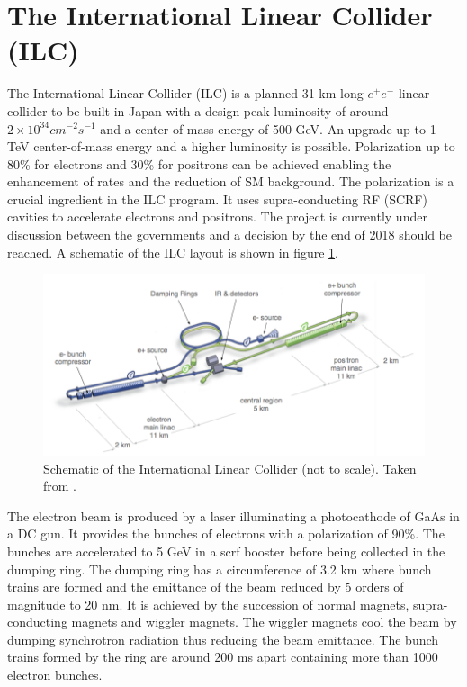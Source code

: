 \section{The International Linear Collider (ILC)}
\label{sec:ILC}

The International Linear Collider (ILC) is a planned 31 km long $e^+e^-$ linear collider to be built in Japan with a design peak luminosity of around $2 \times 10^{34} cm^{-2}s^{-1}$ and a center-of-mass energy of 500 GeV. An upgrade up to 1 TeV center-of-mass energy and a higher luminosity is possible. Polarization up to 80\% for electrons and 30\% for positrons can be achieved enabling the enhancement of rates and the reduction of SM background. The polarization is a crucial ingredient in the ILC program. It uses supra-conducting RF (SCRF) cavities to accelerate electrons and positrons. The project is currently under discussion between the governments and a decision by the end of 2018 should be reached. A schematic of the ILC layout is shown in figure \ref{fig:ILC_schematic}.

\begin{figure}[htbp!]
  \centering
  \includegraphics[width=0.7\linewidth]{chap2/fig/ILC_schematic.png}
  \caption{Schematic of the International Linear Collider (not to scale). Taken from \cite{ILC_TDR_Vol1}.} \label{fig:ILC_schematic}
\end{figure}

The electron beam is produced by a laser illuminating a photocathode of GaAs in a DC gun. It provides the bunches of electrons with a polarization of 90\%. The bunches are accelerated to 5 GeV in a \acrshort{scrf} booster before being collected in the dumping ring. The dumping ring has a circumference of 3.2 km where bunch trains are formed and the emittance of the beam reduced by 5 orders of magnitude to 20 nm. It is achieved by the succession of normal magnets, supra-conducting magnets and wiggler magnets. The wiggler magnets cool the beam by dumping synchrotron radiation thus reducing the beam emittance. The bunch trains formed by the ring are around 200 ms apart containing more than 1000 electron bunches.

